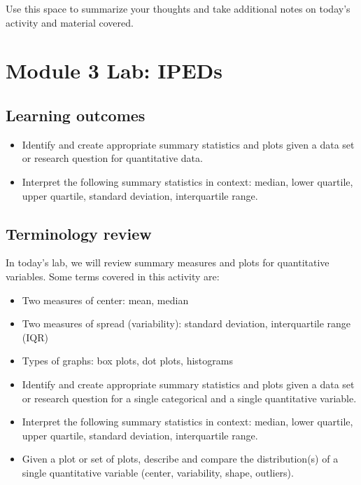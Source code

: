 \documentclass[
]{report}
\begin{document}
Use this space to summarize your thoughts and take additional notes on today's activity and material covered.

\newpage

\hypertarget{module-3-lab-ipeds}{%
\section{Module 3 Lab: IPEDs}\label{module-3-lab-ipeds}}


\hypertarget{learning-outcomes-6}{%
\subsection{Learning outcomes}\label{learning-outcomes-6}}

\begin{itemize}
\item
  Identify and create appropriate summary statistics and plots
  given a data set or research question for quantitative data.
\item
  Interpret the following summary statistics in context:
  median, lower quartile, upper quartile,
  standard deviation, interquartile range.
\end{itemize}

\hypertarget{terminology-review-6}{%
\subsection{Terminology review}\label{terminology-review-6}}

In today's lab, we will review summary measures and plots for quantitative variables. Some terms covered in this activity are:

\begin{itemize}
\item
  Two measures of center: mean, median
\item
  Two measures of spread (variability): standard deviation, interquartile range (IQR)
\item
  Types of graphs: box plots, dot plots, histograms
\item
  Identify and create appropriate summary statistics and plots given a data set or research question for a single categorical and a single quantitative variable.
\item
  Interpret the following summary statistics in context:
  median, lower quartile, upper quartile,
  standard deviation, interquartile range.
\item
  Given a plot or set of plots, describe and compare the distribution(s)
  of a single quantitative variable
  (center, variability, shape, outliers).
\end{itemize}
\end{document}
